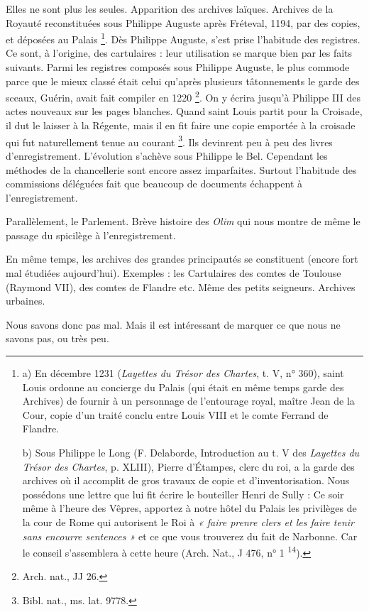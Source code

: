 \documentclass[french,twoside]{book} %
\begin{document}
Elles ne sont plus les seules. Apparition des archives laïques. Archives de la Royauté reconstituées sous Philippe Auguste après Fréteval, 1194, par des copies, et déposées au Palais \footnote{\noindent a) En décembre 1231 ({\itshape Layettes du Trésor des Chartes}, t. V, n° 360), saint Louis ordonne au concierge du Palais (qui était en même temps garde des Archives) de fournir à un personnage de l’entourage royal, maître Jean de la Cour, copie d’un traité conclu entre Louis VIII et le comte Ferrand de Flandre.\par
b) Sous Philippe le Long (F. Delaborde, Introduction au t. V des {\itshape Layettes du Trésor des Chartes}, p. XLIII), Pierre d’Étampes, clerc du roi, a la garde des archives où il accomplit de gros travaux de copie et d’inventorisation. Nous possédons une lettre que lui fit écrire le bouteiller Henri de Sully : Ce soir même à l’heure des Vêpres, apportez à notre hôtel du Palais les privilèges de la cour de Rome qui autorisent le Roi à \emph{« faire prenre clers et les faire tenir sans encourre sentences »} et ce que vous trouverez du fait de Narbonne. Car le conseil s’assemblera à cette heure (Arch. Nat., J 476, n° 1 \textsuperscript{14}).
}. Dès Philippe Auguste, s’est prise l’habitude des registres. Ce sont, à l’origine, des cartulaires : leur utilisation se marque bien par les faits suivants. Parmi les registres composés sous Philippe Auguste, le plus commode parce que le mieux classé était celui qu’après plusieurs tâtonnements le garde des sceaux, Guérin, avait fait compiler en 1220 \footnote{Arch. nat., JJ 26.}. On y écrira jusqu’à Philippe III des actes nouveaux sur les pages blanches. Quand saint Louis partit pour la Croisade, il dut le laisser à la Régente, mais il en fit faire une copie emportée à la croisade qui fut naturellement tenue au courant \footnote{Bibl. nat., ms. lat. 9778.}. Ils devinrent peu à peu des livres d’enregistrement. L’évolution s’achève sous Philippe le Bel. Cependant les méthodes de la chancellerie sont encore assez imparfaites. Surtout l’habitude des commissions déléguées fait que beaucoup de documents échappent à l’enregistrement.\par
\label{p3} Parallèlement, le Parlement. Brève histoire des {\itshape Olim} qui nous montre de même le passage du spicilège à l’enregistrement.\par
En même temps, les archives des grandes principautés se constituent (encore fort mal étudiées aujourd’hui). Exemples : les Cartulaires des comtes de Toulouse (Raymond VII), des comtes de Flandre etc. Même des petits seigneurs. Archives urbaines.\par
Nous savons donc pas mal. Mais il est intéressant de marquer ce que nous ne savons pas, ou très peu.\par
\end{document}
